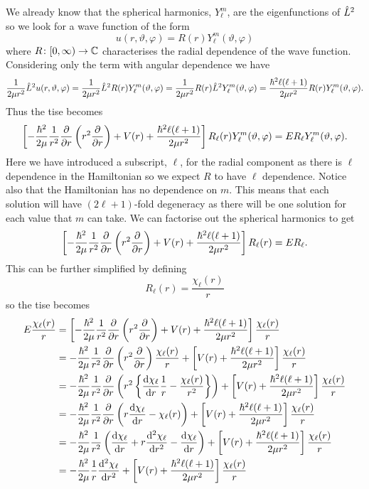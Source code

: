 We already know that the spherical harmonics, \(Y_\ell^m\), are the eigenfunctions of \(\hat{L}^2\) so we look for a wave function of the form
\[u(r, \vartheta, \varphi) = R(r)Y_\ell^m(\vartheta, \varphi)\]
where \(R\colon[0, \infty)\to\mathbb{C}\) characterises the radial dependence of the wave function.
Considering only the term with angular dependence we have
\[\frac{1}{2\mu r^2}\hat{L}^2u(r, \vartheta, \varphi) = \frac{1}{2\mu r^2}\hat{L}^2R(r)Y_\ell^m(\vartheta, \varphi) = \frac{1}{2\mu r^2}R(r)\hat{L}^2Y_\ell^m(\vartheta, \varphi) = \frac{\hbar^2 \ell(\ell + 1)}{2\mu r^2}R(r)Y_\ell^m(\vartheta, \varphi).\]
Thus the \gls{tise} becomes
\[\left[-\frac{\hbar^2}{2\mu}\frac{1}{r^2}\pdv{r} \left(r^2\pdv{r}\right) + V(r) + \frac{\hbar^2\ell(\ell + 1)}{2\mu r^2}\right]R_\ell(r)Y_\ell^m(\vartheta, \varphi) = ER_{\ell}Y_\ell^m(\vartheta, \varphi).\]
Here we have introduced a subscript, \(\ell\), for the radial component as there is \(\ell\) dependence in the Hamiltonian so we expect \(R\) to have \(\ell\) dependence.
Notice also that the Hamiltonian has no dependence on \(m\).
This means that each solution will have \((2\ell + 1)\)-fold degeneracy as there will be one solution for each value that \(m\) can take.
We can factorise out the spherical harmonics to get
\[\left[-\frac{\hbar^2}{2\mu}\frac{1}{r^2}\pdv{r} \left(r^2\pdv{r}\right) + V(r) + \frac{\hbar^2\ell(\ell + 1)}{2\mu r^2}\right]R_\ell(r) = ER_{\ell}.\]
This can be further simplified by defining
\[R_\ell(r) = \frac{\chi_\ell(r)}{r}\]
so the \gls{tise} becomes
\begin{align*}
    E\frac{\chi_\ell(r)}{r} &= \left[-\frac{\hbar^2}{2\mu} \frac{1}{r^2} \pdv{r} \left(r^2\pdv{r}\right) + V(r) + \frac{\hbar^2\ell(\ell + 1)}{2\mu r^2}\right]\frac{\chi_\ell(r)}{r}\\
    &= -\frac{\hbar^2}{2\mu}\frac{1}{r^2}\pdv{r} \left(r^2 \pdv{r}\right) \frac{\chi_\ell(r)}{r} + \left[V(r) + \frac{\hbar^2\ell(\ell + 1)}{2\mu r^2}\right] \frac{\chi_\ell(r)}{r}\\
    &= -\frac{\hbar^2}{2\mu}\frac{1}{r^2}\pdv{r} \left(r^2 \left\{\dv{\chi_\ell}{r}\frac{1}{r} - \frac{\chi_\ell(r)}{r^2}\right\}\right) + \left[V(r) + \frac{\hbar^2\ell(\ell + 1)}{2\mu r^2}\right] \frac{\chi_\ell(r)}{r}\\
    &= -\frac{\hbar^2}{2\mu}\frac{1}{r^2}\pdv{r} \left(r\dv{\chi_\ell}{r} - \chi_\ell(r)\right) + \left[V(r) + \frac{\hbar^2\ell(\ell + 1)}{2\mu r^2}\right] \frac{\chi_\ell(r)}{r}\\
    &= -\frac{\hbar^2}{2\mu}\frac{1}{r^2}\left(\dv{\chi_\ell}{r} + r\dv[2]{\chi_\ell}{r} - \dv{\chi_\ell}{r}\right) + \left[V(r) + \frac{\hbar^2\ell(\ell + 1)}{2\mu r^2}\right] \frac{\chi_\ell(r)}{r}\\
    &= -\frac{\hbar^2}{2\mu}\frac{1}{r}\dv[2]{\chi_\ell}{r} + \left[V(r) + \frac{\hbar^2\ell(\ell + 1)}{2\mu r^2}\right] \frac{\chi_\ell(r)}{r}\\
\end{align*}
